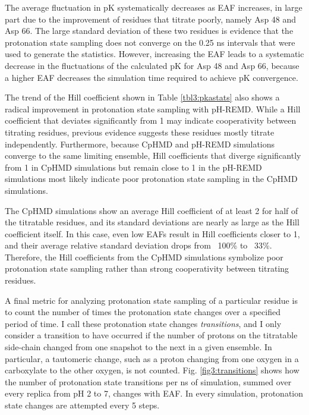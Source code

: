 The  average fluctuation in pK systematically decreases as EAF increases,
in large part due to the improvement of residues that titrate poorly, namely Asp
48 and Asp 66. The large standard deviation of these two residues is evidence
that the protonation state sampling does not converge on the 0.25 ns intervals
that were used to generate the statistics. However, increasing the EAF leads to
a systematic decrease in the fluctuations of the calculated pK for Asp 48
and Asp 66, because a higher EAF decreases the simulation time required to
achieve pK convergence.

The trend of the Hill coefficient shown in Table \ref{tbl3:pkastats} also shows
a radical improvement in protonation state sampling with pH-REMD.  While a Hill
coefficient that deviates significantly from 1 may indicate cooperativity
between titrating residues, previous evidence suggests these residues mostly
titrate independently.  \cite{Mongan_JComputChem_2004_v25_p2038}  Furthermore,
because CpHMD and pH-REMD simulations converge to the same limiting ensemble,
Hill coefficients that diverge significantly from 1 in CpHMD simulations but
remain close to 1 in the pH-REMD simulations most likely indicate poor
protonation state sampling in the CpHMD simulations.

The CpHMD simulations show an average Hill coefficient of at least 2 for half of
the titratable residues, and its standard deviations are nearly as large as the
Hill coefficient itself. In this case, even low EAFs result in Hill coefficients
closer to 1, and their average relative standard deviation drops from ~100\% to
~33\%.  Therefore, the Hill coefficients from the CpHMD simulations symbolize
poor protonation state sampling rather than strong cooperativity between
titrating residues.

A final metric for analyzing protonation state sampling of a particular residue
is to count the number of times the protonation state changes over a specified
period of time.  I call these protonation state changes \emph{transitions}, and
I only consider a transition to have occurred if the number of protons on the
titratable side-chain changed from one snapshot to the next in a given ensemble.
In particular, a tautomeric change, such as a proton changing from one oxygen in
a carboxylate to the other oxygen, is not counted. Fig. \ref{fig3:transitions}
shows how the number of protonation state transitions per ns of simulation,
summed over every replica from pH 2 to 7, changes with EAF.  In every
simulation, protonation state changes are attempted every 5 steps.

